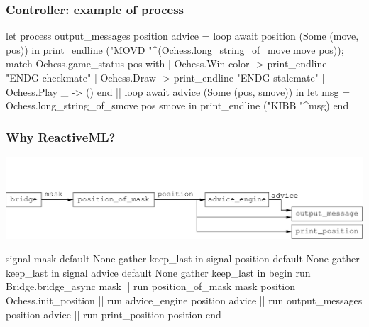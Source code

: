 \documentclass[t]{beamer}
\begin{document}
\begin{frame}[fragile]
\frametitle{Controller: example of process}

\begin{lstrml}
let process output_messages position advice =
  loop
    await position (Some (move, pos)) in
    print_endline ("MOVD "^(Ochess.long_string_of_move move pos));
    match Ochess.game_status pos with
    | Ochess.Win color -> print_endline "ENDG checkmate"
    | Ochess.Draw -> print_endline "ENDG stalemate"
    | Ochess.Play _ -> ()
  end
  ||
  loop
    await advice (Some (pos, smove)) in
    let msg = Ochess.long_string_of_smove pos smove in
    print_endline ("KIBB "^msg)
  end
\end{lstrml}

\end{frame}


\begin{frame}[fragile]
\frametitle{Why ReactiveML?}

\includegraphics[scale=0.6]{figures/controller}

\begin{lstrml}
  signal mask default None gather keep_last in
  signal position default None gather keep_last in
  signal advice default None gather keep_last in
  begin
    run Bridge.bridge_async mask ||
    run position_of_mask mask position Ochess.init_position ||
    run advice_engine position advice ||
    run output_messages position advice ||
    run print_position position
  end
\end{lstrml}

\end{frame}

\end{document}
